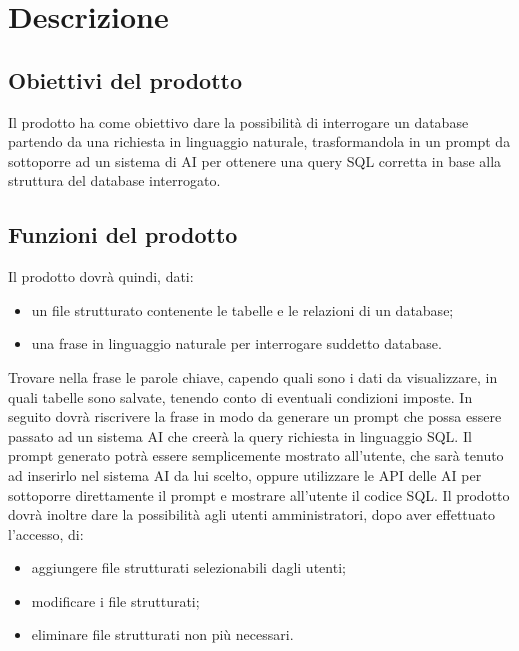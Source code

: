 \section{Descrizione}
\subsection{Obiettivi del prodotto}
Il prodotto ha come obiettivo dare la possibilità di interrogare un database partendo da una richiesta in linguaggio naturale, trasformandola in un prompt da sottoporre ad un sistema di AI per ottenere una query SQL corretta in base alla struttura del database interrogato.

\subsection{Funzioni del prodotto}
Il prodotto dovrà quindi, dati:
\begin{itemize}
	\item un file strutturato contenente le tabelle e le relazioni di un database;
	\item una frase in linguaggio naturale per interrogare suddetto database.
\end{itemize}
Trovare nella frase le parole chiave, capendo quali sono i dati da visualizzare, in quali tabelle sono salvate, tenendo conto di eventuali condizioni imposte.
In seguito dovrà riscrivere la frase in modo da generare un prompt che possa essere passato ad un sistema AI che creerà la query richiesta in linguaggio SQL.
Il prompt generato potrà essere semplicemente mostrato all’utente, che sarà tenuto ad inserirlo nel sistema AI da lui scelto, oppure utilizzare le API delle AI per sottoporre direttamente il prompt e mostrare all’utente il codice SQL.
Il prodotto dovrà inoltre dare la possibilità agli utenti amministratori, dopo aver effettuato l’accesso, di:
\begin{itemize}
	\item aggiungere file strutturati selezionabili dagli utenti;
	\item modificare i file strutturati;
	\item eliminare file strutturati non più necessari.
\end{itemize}